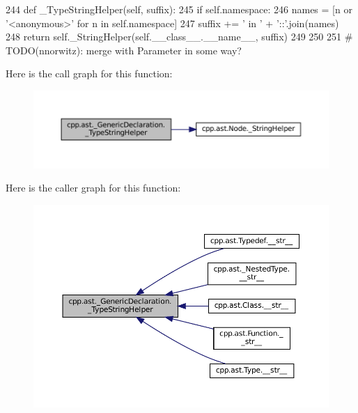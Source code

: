 \begin{DoxyCode}
244     \textcolor{keyword}{def }\_TypeStringHelper(self, suffix):
245         \textcolor{keywordflow}{if} self.namespace:
246             names = [n \textcolor{keywordflow}{or} \textcolor{stringliteral}{'<anonymous>'} \textcolor{keywordflow}{for} n \textcolor{keywordflow}{in} self.namespace]
247             suffix += \textcolor{stringliteral}{' in '} + \textcolor{stringliteral}{'::'}.join(names)
248         \textcolor{keywordflow}{return} self.\_StringHelper(self.\_\_class\_\_.\_\_name\_\_, suffix)
249 
250 
251 \textcolor{comment}{# TODO(nnorwitz): merge with Parameter in some way?}
\end{DoxyCode}
Here is the call graph for this function\+:
\nopagebreak
\begin{figure}[H]
\begin{center}
\leavevmode
\includegraphics[width=350pt]{classcpp_1_1ast_1_1__GenericDeclaration_a2ab2d07ccfa5d51ed153e82004c49e98_cgraph}
\end{center}
\end{figure}
Here is the caller graph for this function\+:
\nopagebreak
\begin{figure}[H]
\begin{center}
\leavevmode
\includegraphics[width=350pt]{classcpp_1_1ast_1_1__GenericDeclaration_a2ab2d07ccfa5d51ed153e82004c49e98_icgraph}
\end{center}
\end{figure}
\mbox{\label{classcpp_1_1ast_1_1__GenericDeclaration_a1437d31271ea8cda62da22e2ce427a85}} 
